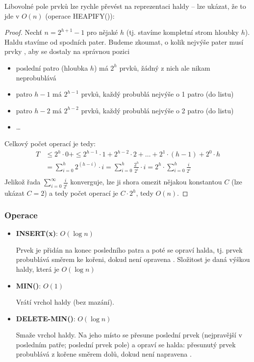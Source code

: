 \documentclass[11pt]{report} %
\numberwithin{equation}{section}
\begin{document}
Libovolné pole prvků lze rychle převést na reprezentaci haldy -- lze ukázat, že to jde v $O(n)$ (operace HEAPIFY()):
\begin{proof}
Nechť $n = 2^{h+1} - 1$ pro nějaké $h$ (tj. stavíme kompletní strom hloubky $h$). Haldu stavíme od spodních pater. Budeme zkoumat, o kolik nejvýše pater musí prvky , aby se dostaly na správnou pozici
\begin{itemize}
	
	
	\item poslední patro (hloubka $h$) má $2^h$ prvků, žádný z nich ale nikam neprobublává
	\item patro $h-1$ má $2^{h-1}$ prvků, každý probublá nejvýše o 1 patro (do listu)
	\item patro $h-2$ má $2^{h-2}$ prvků, každý probublá nejvýše o 2 patro (do listu)
	\item \dots
\end{itemize}

Celkový počet operací je tedy:
\begin{align*}
T &\leq 2^h \cdot 0 + \leq 2^{h-1}\cdot 1 + 2^{h-2} \cdot 2 + \dots + 2^1 \cdot (h-1) + 2^0 \cdot h \\
 &=\sum\limits_{i = 0}^{h} 2^{(h-i)} \cdot i =\sum\limits_{i = 0}^{h} \frac{2^{h}}{2^i} \cdot i =2^h \cdot\sum\limits_{i = 0}^{h} \frac{i}{2^i}\\
\end{align*}
Jelikož řada $\sum\limits_{i = 0}^{\infty} \frac{i}{2^i}$ konverguje, lze ji shora omezit nějakou konstantou $C$ (lze ukázat $C = 2$) a tedy počet operací je $C\cdot 2^h$, tedy $O(n)$.
\end{proof}


\subsubsection{Operace}
\begin{itemize}
	
	
	\item \textbf{INSERT(x)}: $O(\log n)$
	
	 Prvek je přidán na konec posledního patra a poté se opraví halda, tj. prvek probublává směrem ke kořeni, dokud není opravena . Složitost je daná výškou haldy, která je $O(\log n)$
	
	\item \textbf{MIN()}: $O(1)$
	
	Vrátí vrchol haldy (bez mazání).
	
	\item \textbf{DELETE-MIN()}: $O(\log n)$
	
	Smaže vrchol haldy. Na jeho místo se přesune poslední prvek (nejpravější v posledním patře; poslední prvek pole) a opraví se halda: přesunutý prvek probublává z kořene směrem dolů, dokud není napravena .	
\end{itemize}
\end{document}

